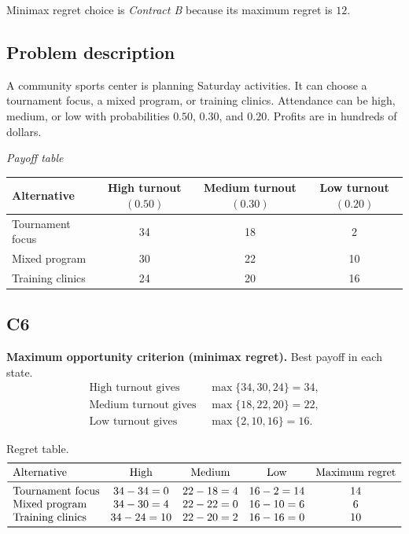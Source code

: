 \begin{ExamProblems}
		Minimax regret choice is \emph{Contract B} because its maximum regret is $12$.

		\item
		\subsection*{Problem description}
		A community sports center is planning Saturday activities. It can choose a tournament focus, a mixed program, or training clinics. Attendance can be high, medium, or low with probabilities $0.50$, $0.30$, and $0.20$. Profits are in hundreds of dollars.

		\begin{center}
			\textit{Payoff table}\\
			\begin{tabular}{l c c c}
				\toprule
				Alternative & High turnout $(0.50)$ & Medium turnout $(0.30)$ & Low turnout $(0.20)$ \\
				\midrule
				Tournament focus & 34 & 18 & 2 \\
				Mixed program & 30 & 22 & 10 \\
				Training clinics & 24 & 20 & 16 \\
				\bottomrule
			\end{tabular}
		\end{center}

		\subsection*{C6}
		\textbf{Maximum opportunity criterion (minimax regret).} Best payoff in each state.
		\[
		\begin{aligned}
		\text{High turnout gives } &\max\{34,30,24\}=34,\\
		\text{Medium turnout gives } &\max\{18,22,20\}=22,\\
		\text{Low turnout gives } &\max\{2,10,16\}=16.
		\end{aligned}
		\]

		Regret table.
		\[
		\begin{array}{lcccc}
			\toprule
			\text{Alternative} & \text{High} & \text{Medium} & \text{Low} & \text{Maximum regret}\\
			\midrule
			\text{Tournament focus} & 34-34=0 & 22-18=4 & 16-2=14 & 14\\
			\text{Mixed program} & 34-30=4 & 22-22=0 & 16-10=6 & 6\\
			\text{Training clinics} & 34-24=10 & 22-20=2 & 16-16=0 & 10\\
			\bottomrule
		\end{array}
		\]


\end{ExamProblems}

